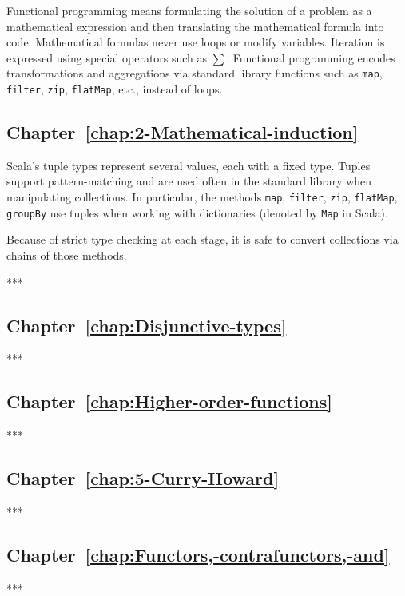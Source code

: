 Functional programming means formulating the solution of a problem
as a mathematical expression and then translating the mathematical
formula into code. Mathematical formulas never use loops or modify
variables. Iteration is expressed using special operators such as
$\sum$. Functional programming encodes transformations and aggregations
via standard library functions such as \lstinline!map!, \lstinline!filter!,
\lstinline!zip!, \lstinline!flatMap!, etc., instead of loops.

\subsection{Chapter~\ref{chap:2-Mathematical-induction}}

Scala\textsf{'}s tuple types represent several values, each with a fixed type.
Tuples support pattern-matching and are used often in the standard
library when manipulating collections. In particular, the methods
\lstinline!map!, \lstinline!filter!, \lstinline!zip!, \lstinline!flatMap!,
\lstinline!groupBy! use tuples when working with dictionaries (denoted
by \lstinline!Map! in Scala).

Because of strict type checking at each stage, it is safe to convert
collections via chains of those methods.

{*}{*}{*}

\subsection{Chapter~\ref{chap:Disjunctive-types}}

{*}{*}{*}

\subsection{Chapter~\ref{chap:Higher-order-functions}}

{*}{*}{*}

\subsection{Chapter~\ref{chap:5-Curry-Howard}}

{*}{*}{*}

\subsection{Chapter~\ref{chap:Functors,-contrafunctors,-and}}

{*}{*}{*}

